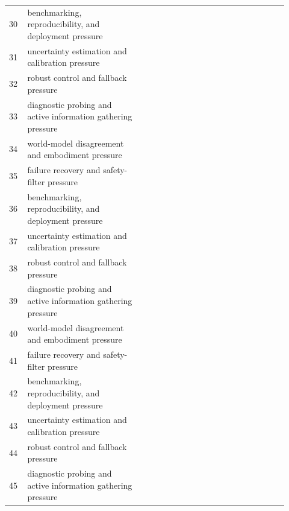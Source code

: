 \documentclass[11pt]{article}
\begin{document}
\begin{longtable}{p{0.06\linewidth}p{0.38\linewidth}p{0.48\linewidth}}
30 & benchmarking, reproducibility, and deployment pressure & \citep{procopio2009learning88,tang2025deep89,kim2026continuous90} \\
31 & uncertainty estimation and calibration pressure & \citep{jang2026openworld91,krejci2025learning92,xianpengqiao2026complete93} \\
32 & robust control and fallback pressure & \citep{kumari2026investigating94,ahmadova2025learning95,k2025enhanced96} \\
33 & diagnostic probing and active information gathering pressure & \citep{zhou2024copedadvancing97,sygulla2021learning98,mahzoon2024deep99} \\
34 & world-model disagreement and embodiment pressure & \citep{huang2025agentic100,nguyen2019using101,slade2022personalizing102} \\
35 & failure recovery and safety-filter pressure & \citep{kubo2022party103,houston2018make104,lahoti2023responsible105} \\
36 & benchmarking, reproducibility, and deployment pressure & \citep{kafuluma2023standardization106,li2021soft107,simicmuller2020preservice108} \\
37 & uncertainty estimation and calibration pressure & \citep{daou2018robotic109,feldstein2020achieving110,brook2021adaptive111} \\
38 & robust control and fallback pressure & \citep{boyer2023reducing112,jiang2024advancing113,yi2024dynamic114} \\
39 & diagnostic probing and active information gathering pressure & \citep{pagan2024worldmakers115,mendonca2023structured116,radosavovic2023realworld117} \\
40 & world-model disagreement and embodiment pressure & \citep{sun2023when118,motrinchuk2024small119,aichaoui2024enhancing120} \\
41 & failure recovery and safety-filter pressure & \citep{wang2020a121,cai2019causal122,wang2005protocols123} \\
42 & benchmarking, reproducibility, and deployment pressure & \citep{das2007mobilityaware124,tang2025deep125,pico2016how126} \\
43 & uncertainty estimation and calibration pressure & \citep{stepanova2018mapping127,garrett2021integrated128,liu2024vertical129} \\
44 & robust control and fallback pressure & \citep{aledhari2020federated130,calabrese2025socially131,freitas2020ontologies132} \\
45 & diagnostic probing and active information gathering pressure & \citep{tsukiyama2005world133,xiu2022discovery134,wang2021a135} \\

\end{longtable}
\end{document}
